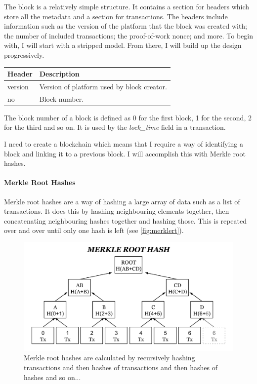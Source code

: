 \documentclass{article}
\begin{document}
The block is a relatively simple structure. It contains a section for headers which store all the metadata and a section for transactions. The headers include information such as the version of the platform that the block was created with; the number of included transactions; the proof-of-work nonce; and more. To begin with, I will start with a stripped model. From there, I will build up the design progressively.
\begin{table}[h]
\centering
\begin{tabular}{|l|l|}
\hline
\rowcolor{tblgrey} 
Header      & Description                                       \\ \hline
version     & Version of platform used by block creator.        \\ \hline
no          & Block number.                                     \\ \hline
\end{tabular}
\end{table}

The block number of a block is defined as 0 for the first block, 1 for the second, 2 for the third and so on. It is used by the \textit{lock\_time} field in a transaction.

I need to create a blockchain which means that I require a way of identifying a block and linking it to a previous block. I will accomplish this with Merkle root hashes.

\paragraph{Merkle Root Hashes}
Merkle root hashes are a way of hashing a large array of data such as a list of transactions. It does this by hashing neighbouring elements together, then concatenating neighbouring hashes together and hashing those. This is repeated over and over until only one hash is left (see \autoref{fig:merklert}).
\begin{figure}[h]
    \centering
    \includegraphics[width=0.95\linewidth]{Images/Diagrams/merkle_root.png}
    \caption{Merkle root hashes are calculated by recursively hashing transactions and then hashes of transactions and then hashes of hashes and so on...}
    \label{fig:merklert}
\end{figure}
\end{document}
